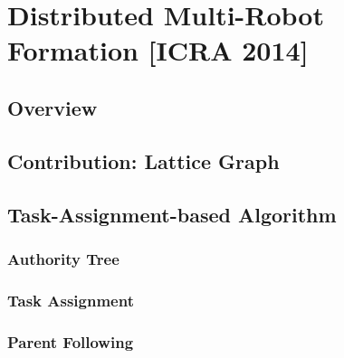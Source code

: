 \documentclass[10pt]{beamer}
\begin{document}




\section{Distributed Multi-Robot Formation [ICRA 2014]}
\subsection[Overview]{Overview}







\subsection[Lattice Graph]{Contribution: Lattice Graph}










\subsection[Algorithm2]{Task-Assignment-based Algorithm}



\subsubsection[Algorithm2: Authority]{Authority Tree}





\subsubsection[Algorithm2: Task Assignment]{Task Assignment}






\subsubsection[Algorithm2: Motion Strategy]{Parent Following}
\end{document}
